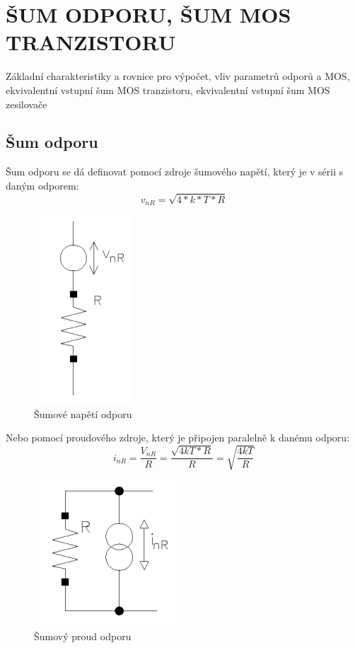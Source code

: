 \section{ŠUM ODPORU, ŠUM MOS TRANZISTORU }
Základní charakteristiky a rovnice pro výpočet, vliv parametrů odporů a MOS, ekvivalentní vstupní šum MOS tranzistoru, ekvivalentní vstupní šum MOS zesilovače

\subsection{Šum odporu}
Šum odporu se dá definovat pomocí zdroje šumového napětí, který je v sérii s daným
odporem:
\begin{equation}
v_{nR}=\sqrt{4*k*T*R}
\end{equation}

\begin{figure}[h]
   \begin{center}
     \includegraphics[scale=0.5]{images/sumR.png}
   \end{center}
   \caption{Šumové napětí odporu}
\end{figure}

Nebo pomocí proudového zdroje, který je připojen paralelně k danému odporu:
\begin{equation}
i_{nR}=\frac{V_{nR}}{R}=\frac{\sqrt{4kT*R}}{R}=\sqrt{\frac{4kT}{R}}
\end{equation}

\begin{figure}[h]
   \begin{center}
     \includegraphics[scale=0.5]{images/sumRI.png}
   \end{center}
   \caption{Šumový proud odporu}
\end{figure}


